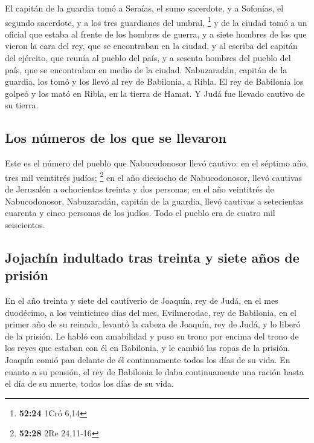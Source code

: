 \begin{paracol}{2}
 El capitán de la guardia tomó a Seraías, el sumo
sacerdote, y a Sofonías, el segundo sacerdote, y a los tres guardianes
del umbral, \footnote{\textbf{52:24} 1Cró 6,14}  y de la
ciudad tomó a un oficial que estaba al frente de los hombres de guerra,
y a siete hombres de los que vieron la cara del rey, que se encontraban
en la ciudad, y al escriba del capitán del ejército, que reunía al
pueblo del país, y a sesenta hombres del pueblo del país, que se
encontraban en medio de la ciudad.  Nabuzaradán, capitán
de la guardia, los tomó y los llevó al rey de Babilonia, a Ribla.
 El rey de Babilonia los golpeó y los mató en Ribla, en
la tierra de Hamat. Y Judá fue llevado cautivo de su tierra.

\hypertarget{los-nuxfameros-de-los-que-se-llevaron}{%
\subsection{Los números de los que se
llevaron}\label{los-nuxfameros-de-los-que-se-llevaron}}

 Este es el número del pueblo que Nabucodonosor llevó
cautivo: en el séptimo año, tres mil veintitrés judíos; \footnote{\textbf{52:28}
  2Re 24,11-16}  en el año dieciocho de Nabucodonosor,
llevó cautivas de Jerusalén a ochocientas treinta y dos personas;
 en el año veintitrés de Nabucodonosor, Nabuzaradán,
capitán de la guardia, llevó cautivas a setecientas cuarenta y cinco
personas de los judíos. Todo el pueblo era de cuatro mil seiscientos.

\hypertarget{jojachuxedn-indultado-tras-treinta-y-siete-auxf1os-de-prisiuxf3n}{%
\subsection{Jojachín indultado tras treinta y siete años de
prisión}\label{jojachuxedn-indultado-tras-treinta-y-siete-auxf1os-de-prisiuxf3n}}

 En el año treinta y siete del cautiverio de Joaquín, rey
de Judá, en el mes duodécimo, a los veinticinco días del mes,
Evilmerodac, rey de Babilonia, en el primer año de su reinado, levantó
la cabeza de Joaquín, rey de Judá, y lo liberó de la prisión.
 Le habló con amabilidad y puso su trono por encima del
trono de los reyes que estaban con él en Babilonia,  y le
cambió las ropas de la prisión. Joaquín comió pan delante de él
continuamente todos los días de su vida.  En cuanto a su
pensión, el rey de Babilonia le daba continuamente una ración hasta el
día de su muerte, todos los días de su vida. \switchcolumn
\begin{otherlanguage}{english}


\end{otherlanguage}
\end{paracol}
